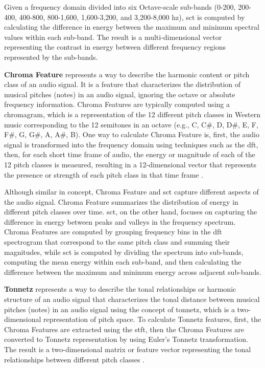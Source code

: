 Given a frequency domain divided into six Octave-scale sub-bands (0-200, 200-400, 400-800, 800-1,600, 1,600-3,200, and 3,200-8,000 \gls{hz}), \gls{sct} is computed by calculating the difference in energy between the maximum and minimum spectral values within each sub-band. The result is a multi-dimensional vector representing the contrast in energy between different frequency regions represented by the sub-bands.

\textbf{Chroma Feature} represents a way to describe the harmonic content or pitch class of an audio signal. It is a feature that characterizes the distribution of musical pitches (notes) in an audio signal, ignoring the octave or absolute frequency information. Chroma Features are typically computed using a chromagram, which is a representation of the 12 different pitch classes in Western music corresponding to the 12 semitones in an octave (e.g., C, C\#, D, D\#, E, F, F\#, G, G\#, A, A\#, B). One way to calculate Chroma Feature is, first, the audio signal is transformed into the frequency domain using techniques such as the \gls{dft}, then, for each short time frame of audio, the energy or magnitude of each of the 12 pitch classes is measured, resulting in a 12-dimensional vector that represents the presence or strength of each pitch class in that time frame \cite{Bartsch2005}.

Although similar in concept, Chroma Feature and \gls{sct} capture different aspects of the audio signal. Chroma Feature summarizes the distribution of energy in different pitch classes over time. \gls{sct}, on the other hand, focuses on capturing the difference in energy between peaks and valleys in the frequency spectrum. Chroma Features are computed by grouping frequency bins in the \gls{dft} spectrogram that correspond to the same pitch class and summing their magnitudes, while \gls{sct} is computed by dividing the spectrum into sub-bands, computing the mean energy within each sub-band, and then calculating the difference between the maximum and minimum energy across adjacent sub-bands.

\textbf{Tonnetz} represents a way to describe the tonal relationships or harmonic structure of an audio signal that characterizes the tonal distance between musical pitches (notes) in an audio signal using the concept of tonnetz, which is a two-dimensional representation of pitch space. To calculate Tonnetz features, first, the Chroma Features are extracted using the \gls{stft}, then the Chroma Features are converted to Tonnetz representation by using Euler's Tonnetz transformation. The result is a two-dimensional matrix or feature vector representing the tonal relationships between different pitch classes \cite{Harte2006}.


